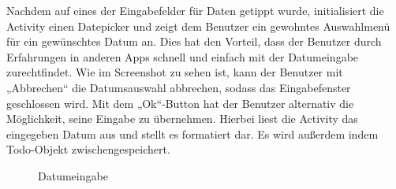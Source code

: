 Nachdem auf eines der Eingabefelder für Daten getippt wurde, initialisiert die Activity einen Datepicker und zeigt dem Benutzer ein gewohntes Auswahlmenü für ein gewünschtes Datum an. Dies hat den Vorteil, dass der Benutzer durch Erfahrungen in anderen Apps schnell und einfach mit der Datumeingabe zurechtfindet. Wie im Screenshot zu sehen ist, kann der Benutzer mit „Abbrechen“ die Datumsauswahl abbrechen, sodass das Eingabefenster geschlossen wird. Mit dem „Ok“-Button hat der Benutzer alternativ die Möglichkeit, seine Eingabe zu übernehmen. Hierbei liest die Activity das eingegeben Datum aus und stellt es formatiert dar. Es wird außerdem indem Todo-Objekt zwischengespeichert.

\begin{figure}[H]
\centering
\begin{minipage}[t]{1\textwidth} %
\caption{Datumeingabe} %

\end{minipage}
\end{figure}
